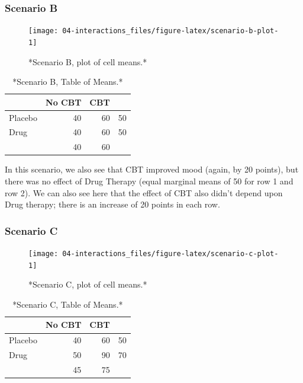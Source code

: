 \documentclass[]{book}
\begin{document}
\hypertarget{scenario-b}{%
\subsubsection*{Scenario B}\label{scenario-b}}

\begin{figure}

{\centering \texttt{[image: 04-interactions\_files/figure-latex/scenario-b-plot-1]} 

}

\caption{*Scenario B, plot of cell means.*}\label{fig:scenario-b-plot}
\end{figure}

\begin{table}

\caption{\label{tab:scenario-b-means}*Scenario B, Table of Means.*}
\centering
\begin{tabular}[t]{l|r|r|l}
\hline
  & No CBT & CBT &   \\
\hline
Placebo & 40 & 60 & 50\\
\hline
Drug & 40 & 60 & 50\\
\hline
 & 40 & 60 & \\
\hline
\end{tabular}
\end{table}

In this scenario, we also see that CBT improved mood (again, by 20 points), but there was no effect of Drug Therapy (equal marginal means of 50 for row 1 and row 2). We can also see here that the effect of CBT also didn't depend upon Drug therapy; there is an increase of 20 points in each row.

\hypertarget{scenario-c}{%
\subsubsection*{Scenario C}\label{scenario-c}}

\begin{figure}

{\centering \texttt{[image: 04-interactions\_files/figure-latex/scenario-c-plot-1]} 

}

\caption{*Scenario C, plot of cell means.*}\label{fig:scenario-c-plot}
\end{figure}

\begin{table}

\caption{\label{tab:scenario-c-means}*Scenario C, Table of Means.*}
\centering
\begin{tabular}[t]{l|r|r|l}
\hline
  & No CBT & CBT &   \\
\hline
Placebo & 40 & 60 & 50\\
\hline
Drug & 50 & 90 & 70\\
\hline
 & 45 & 75 & \\
\hline
\end{tabular}
\end{table}
\end{document}
